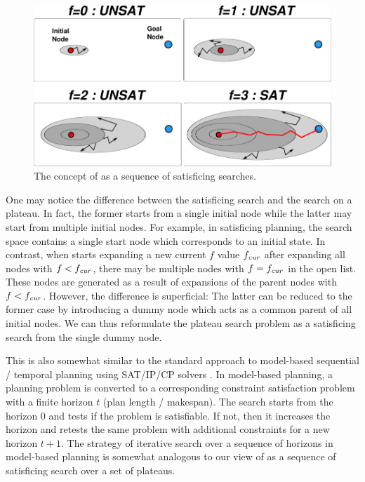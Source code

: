 \begin{figure}[htbp]
 \centering
 \includegraphics[width=0.8\linewidth]{img/astar/plateau-5.pdf}
 \caption{The concept of \astar as a sequence of satisficing searches.}
 \label{fig:astar-sat}
\end{figure}

One may notice the difference between the satisficing search and the search on a plateau.
In fact, the former starts from a single initial node while the latter may start from multiple initial nodes.
For example, in satisficing planning, the search space contains a single start node which corresponds to an initial state.
% 
In contrast, when \astar starts expanding a new current $f$ value $f_{\mit{cur}}$ after expanding all nodes with $f<f_\mit{cur}$,
there may be multiple nodes with $f=f_\mit{cur}$ in the open list.
These nodes are generated as a result of expansions of the parent nodes with $f<f_\mit{cur}$.
% 
However, the difference is superficial: The latter can be reduced to the former case by introducing a dummy node
which acts as a common parent of all initial nodes. We can thus reformulate the plateau search problem as a satisficing search from the single dummy node.

This is also somewhat similar to the standard approach to model-based sequential / temporal planning using SAT/IP/CP solvers \cite{kautz1992planning,van2005optiplan}.
In model-based planning, a
planning problem is converted to a corresponding constraint satisfaction problem with a finite horizon $t$ (plan
length / makespan). The search starts from the horizon 0 and tests if the problem is satisfiable. If not, then it
increases the horizon and retests the same problem with additional constraints for a new horizon $t+1$. 
The strategy of iterative search over a sequence of horizons in model-based planning is somewhat analogous to our view of \astar as a sequence of satisficing search over a set of plateaus.

